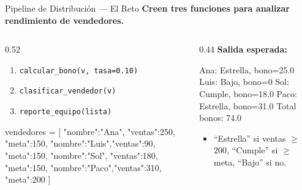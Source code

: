 \documentclass[aspectratio=169, 11pt]{beamer}
\begin{document}
\begin{frame}[fragile,shrink=28]{Pipeline de Distribución --- El Reto}
  \vspace{-6pt}
  {\footnotesize\color{arcaDark}\bfseries
    Creen tres funciones para analizar rendimiento de vendedores.}

  \vspace{4pt}
  \begin{columns}[T]
    \begin{column}{0.52\textwidth}
      {\footnotesize
      \begin{enumerate}\setlength{\itemsep}{3pt}
        \item \texttt{calcular\_bono(v, tasa=0.10)}
        \item \texttt{clasificar\_vendedor(v)}
        \item \texttt{reporte\_equipo(lista)}
      \end{enumerate}
      }

      \vspace{4pt}
      \begin{pyblock}
vendedores = [
  {"nombre":"Ana", "ventas":250, "meta":150},
  {"nombre":"Luis","ventas":90,  "meta":150},
  {"nombre":"Sol", "ventas":180, "meta":150},
  {"nombre":"Paco","ventas":310, "meta":200}
]
      \end{pyblock}
    \end{column}

    \begin{column}{0.44\textwidth}
      {\scriptsize\color{textMuted}\bfseries Salida esperada:}
      \begin{outputblock}
Ana: Estrella, bono=25.0
Luis: Bajo, bono=0
Sol: Cumple, bono=18.0
Paco: Estrella, bono=31.0
Total bonos: 74.0
      \end{outputblock}

      \vspace{2pt}
      {\scriptsize\color{textMuted}
      \begin{itemize}\setlength{\itemsep}{2pt}
        \item[{\color{arcaRed}\scriptsize\faLightbulb}]
          ``Estrella'' si ventas $\geq$ 200,
          ``Cumple'' si $\geq$ meta,
          ``Bajo'' si no.
      \end{itemize}
      }
    \end{column}
  \end{columns}
\end{frame}
\end{document}
